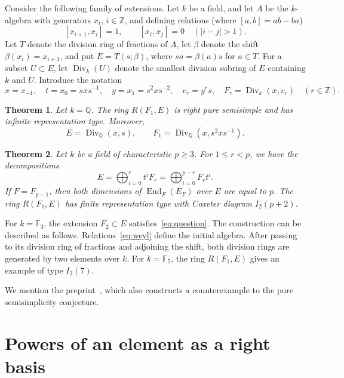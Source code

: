 \documentclass[11pt,a4paper,reqno]{amsart}
\numberwithin{equation}{section}
\newtheorem{theorem}{Theorem}[section]
\theoremstyle{remark}
\newcommand{\Div}{\operatorname{Div}_k}
\newcommand{\End}{\operatorname{End}}
\newcommand{\Q}{\mathbb Q}
\newcommand{\Z}{\mathbb Z}
\begin{document}
Consider the following family of extensions. Let $k$ be a field, and let $A$ be the $k$-algebra
with generators $x_i$, $i\in\Z$, and defining relations (where $[a,b]=ab-ba$)
\begin{equation}\label{eq:weyl}
 [x_{i+1},x_i]=1,\qquad [x_i,x_j]=0\quad (|i-j|>1).
\end{equation}
Let $T$ denote the division ring of fractions of $A$, let $\beta$ denote the shift
$\beta(x_i)=x_{i+1}$, and put $E=T(s;\beta)$, where $sa=\beta(a)s$ for $a\in T$.
For a subset $U\subset E$, let $\Div(U)$ denote the smallest division subring of $E$
containing $k$ and $U$. Introduce the notation
\begin{equation}\label{eq:gens}
 x=x_{-1},\quad t=x_0=sxs^{-1},\quad y=x_1=s^2xs^{-2},\quad
 v_r=y^rs,\quad F_r=\Div(x,v_r)\quad(r\in\Z).
\end{equation}

\begin{theorem}\label{thm:zero}
Let $k=\Q$. The ring $R(F_1,E)$ is right pure semisimple and has infinite representation type. Moreover,
\[
 E=\operatorname{Div}_{\Q}(x,s),\qquad
 F_1=\operatorname{Div}_{\Q}(x,s^2xs^{-1}).
\]
\end{theorem}

\begin{theorem}\label{thm:prime}
Let $k$ be a field of characteristic $p\ge3$. For $1\le r<p$,
we have the decompositions
\begin{equation}\label{eq:bibases}
 E=\bigoplus_{i=0}^{r}t^i F_r
  =\bigoplus_{i=0}^{p-r} F_r t^i .
\end{equation}
If $F=F_{p-1}$, then both dimensions of $\End_F(E_F)$ over $E$ are equal to $p$.
The ring $R(F_1,E)$ has finite representation type with Coxeter diagram $I_2(p+2)$.
\end{theorem}

For $k=\mathbb F_3$, the extension $F_2\subset E$ satisfies~\eqref{eq:question}.
The construction can be described as follows.
Relations~\eqref{eq:weyl} define the initial algebra. After passing to its division ring of fractions and adjoining the shift, both division rings are generated by two elements
over $k$.
For $k=\mathbb F_5$, the ring $R(F_1,E)$ gives an example of type $I_2(7)$.

We mention the preprint~\cite{Ren}, which also constructs a counterexample to the pure semisimplicity conjecture.

\section{Powers of an element as a right basis}
\end{document}

